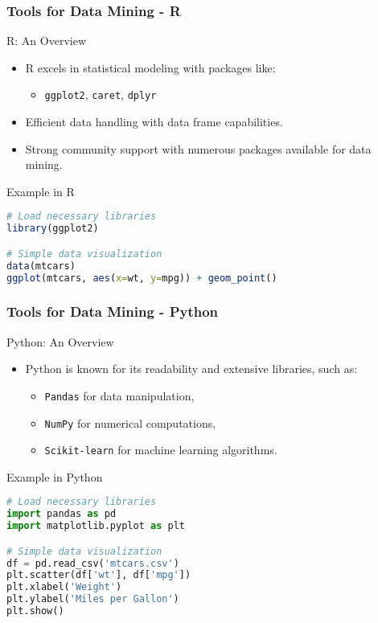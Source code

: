 \documentclass[aspectratio=169]{beamer}
\begin{document}
\begin{frame}[fragile]
    \frametitle{Tools for Data Mining - R}
    \begin{block}{R: An Overview}
        \begin{itemize}
            \item R excels in statistical modeling with packages like:
                \begin{itemize}
                    \item \texttt{ggplot2}, \texttt{caret}, \texttt{dplyr}
                \end{itemize}
            \item Efficient data handling with data frame capabilities.
            \item Strong community support with numerous packages available for data mining.
        \end{itemize}
    \end{block}
    \begin{block}{Example in R}
    \begin{lstlisting}[language=R]
# Load necessary libraries
library(ggplot2)

# Simple data visualization
data(mtcars)
ggplot(mtcars, aes(x=wt, y=mpg)) + geom_point()
    \end{lstlisting}
    \end{block}
\end{frame}

\begin{frame}[fragile]
    \frametitle{Tools for Data Mining - Python}
    \begin{block}{Python: An Overview}
        \begin{itemize}
            \item Python is known for its readability and extensive libraries, such as:
                \begin{itemize}
                    \item \texttt{Pandas} for data manipulation,
                    \item \texttt{NumPy} for numerical computations,
                    \item \texttt{Scikit-learn} for machine learning algorithms.
                \end{itemize}
        \end{itemize}
    \end{block}
    \begin{block}{Example in Python}
    \begin{lstlisting}[language=Python]
# Load necessary libraries
import pandas as pd
import matplotlib.pyplot as plt

# Simple data visualization
df = pd.read_csv('mtcars.csv')
plt.scatter(df['wt'], df['mpg'])
plt.xlabel('Weight')
plt.ylabel('Miles per Gallon')
plt.show()
    \end{lstlisting}
    \end{block}
\end{frame}
\end{document}
